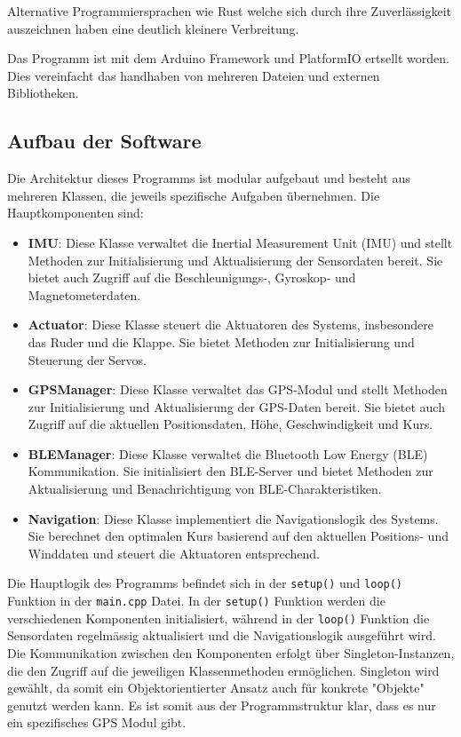 Alternative Programmiersprachen wie Rust welche sich durch ihre Zuverlässigkeit auszeichnen haben eine deutlich kleinere Verbreitung.

Das Programm ist mit dem Arduino Framework und PlatformIO ertsellt worden. Dies vereinfacht das handhaben von mehreren Dateien und externen Bibliotheken.



\subsection{Aufbau der Software}
Die Architektur dieses Programms ist modular aufgebaut und besteht aus mehreren Klassen, die jeweils spezifische Aufgaben übernehmen. Die Hauptkomponenten sind:

\begin{itemize}
    \item \textbf{IMU}: Diese Klasse verwaltet die Inertial Measurement Unit (IMU) und stellt Methoden zur Initialisierung und Aktualisierung der Sensordaten bereit. Sie bietet auch Zugriff auf die Beschleunigungs-, Gyroskop- und Magnetometerdaten.
    \item \textbf{Actuator}: Diese Klasse steuert die Aktuatoren des Systems, insbesondere das Ruder und die Klappe. Sie bietet Methoden zur Initialisierung und Steuerung der Servos.
    \item \textbf{GPSManager}: Diese Klasse verwaltet das GPS-Modul und stellt Methoden zur Initialisierung und Aktualisierung der GPS-Daten bereit. Sie bietet auch Zugriff auf die aktuellen Positionsdaten, Höhe, Geschwindigkeit und Kurs.
    \item \textbf{BLEManager}: Diese Klasse verwaltet die Bluetooth Low Energy (BLE) Kommunikation. Sie initialisiert den BLE-Server und bietet Methoden zur Aktualisierung und Benachrichtigung von BLE-Charakteristiken.
    \item \textbf{Navigation}: Diese Klasse implementiert die Navigationslogik des Systems. Sie berechnet den optimalen Kurs basierend auf den aktuellen Positions- und Winddaten und steuert die Aktuatoren entsprechend.
\end{itemize}

Die Hauptlogik des Programms befindet sich in der \texttt{setup()} und \texttt{loop()} Funktion in der \texttt{main.cpp} Datei. In der \texttt{setup()} Funktion werden die verschiedenen Komponenten initialisiert, während in der \texttt{loop()} Funktion die Sensordaten regelmässig aktualisiert und die Navigationslogik ausgeführt wird. Die Kommunikation zwischen den Komponenten erfolgt über Singleton-Instanzen, die den Zugriff auf die jeweiligen Klassenmethoden ermöglichen.
Singleton wird gewählt, da somit ein Objektorientierter Ansatz auch für konkrete "Objekte" genutzt werden kann. Es ist somit aus der Programmstruktur klar, dass es nur ein spezifisches GPS Modul gibt.


